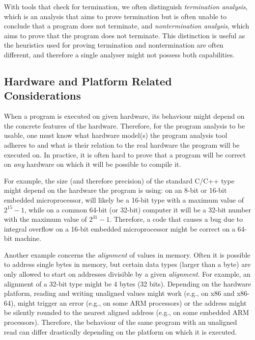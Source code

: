 With tools that check for termination, we often distinguish \emph{termination analysis}, which is an analysis that aims to prove termination but is often unable to conclude that a program does not terminate, and \emph{nontermination analysis}, which aims to prove that the program does not terminate.
This distinction is useful as the heuristics used for proving termination and nontermination are often different, and therefore a single analyser might not possess both capabilities.

\subsection{Hardware and Platform Related Considerations}

When a program is executed on given hardware, its behaviour might
depend on the concrete features of the hardware.
Therefore, for the program analysis to be usable, one must know what
hardware model(s) the program analysis tool adheres to and what is their
relation to the real hardware the program will be executed on.
In practice, it is often hard to prove that a program will be correct on
\emph{any} hardware on which it will be possible to compile it.

For example, the size (and therefore precision) of the standard C/C++ type
 might depend on the hardware the program is using: on an 8-bit or
16-bit embedded microprocessor,  will likely be a 16-bit type with a
maximum value of $2^{15} - 1$, while on a common 64-bit (or 32-bit) computer it
will be a 32-bit number with the maximum value of $2^{31}-1$.
Therefore, a code that causes a bug due to integral overflow on a 16-bit
embedded microprocessor might be correct on a 64-bit machine.

Another example concerns the \emph{alignment} of values in memory.
Often it is
possible to address single bytes in memory, but certain data types (larger
than a byte) are only allowed to start on addresses divisible by a given
\emph{alignment}.
For example, an alignment of a 32-bit  type might be 4 bytes (32
bits).
Depending on the hardware platform, reading and writing unaligned values might
work (e.g., on x86 and x86-64), might trigger an error (e.g., on some ARM
processors) or the address might be silently rounded to the nearest
aligned address (e.g., on some embedded ARM processors).
Therefore, the behaviour of the same program with an unaligned read can differ
drastically depending on the platform on which it is executed.

